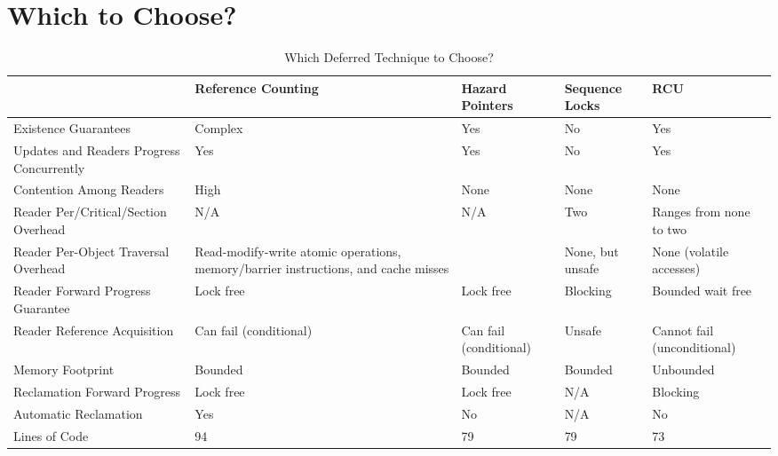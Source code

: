
\section{Which to Choose?}
\label{sec:defer:Which to Choose?}

\begin{table*}
\footnotesize
\centering\tymin=0.4in\tymax=2in
\begin{tabulary}{5.3in}{L||L|L|L|L}

		& Reference Counting
			& Hazard Pointers
				& Sequence Locks
					& RCU \\
	\hline
	\hline
	Existence Guarantees
		& Complex
			& Yes
				& No
					& Yes \\
	\hline
	Updates and Readers Progress Concurrently
		& Yes
			& Yes
				& No
					& Yes \\
	\hline
	Contention Among Readers
		& High
			& None
				& None
					& None \\
	\hline
	Reader Per\-/Critical\-/Section Overhead
		& N/A
			& N/A
				& Two 
					& Ranges from none to two
					   \\
	\hline
	Reader Per-Object Traversal Overhead
		& Read-modify-write atomic operations, memory\-/barrier
		  instructions, and cache misses
			& 
				& None, but unsafe
					& None (volatile accesses) \\
	\hline
	Reader Forward Progress Guarantee
		& Lock free
			& Lock free
				& Blocking
					& Bounded wait free \\
	\hline
	Reader Reference Acquisition
		& Can fail (conditional)
			& Can fail (conditional)
				& Unsafe
					& Cannot fail (unconditional) \\
	\hline
	Memory Footprint
		& Bounded
			& Bounded
				& Bounded
					& Unbounded \\
	\hline
	Reclamation Forward Progress
		& Lock free
			& Lock free
				& N/A
					& Blocking \\
	\hline
	Automatic Reclamation
		& Yes
			& No
				& N/A
					& No \\
	\hline
	Lines of Code
		& 94
			& 79
				& 79
					& 73 \\
\end{tabulary}
\caption{Which Deferred Technique to Choose?}
\label{tab:defer:Which Deferred Technique to Choose?}
\end{table*}

